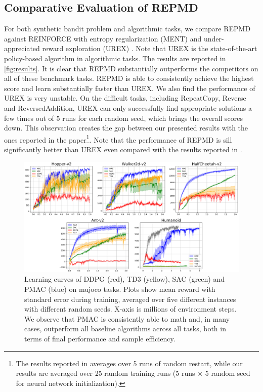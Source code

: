 \subsection{Comparative Evaluation of REPMD}

For both synthetic bandit problem and algorithmic tasks, we compare REPMD against REINFORCE with entropy regularization (MENT) \citep{williams1992simple} and under-appreciated reward exploration (UREX) \citep{nachum2017improving}. Note that UREX is the state-of-the-art policy-based algorithm in algorithmic tasks. The results are reported in \cref{fig:results}. It is clear that REPMD substantially outperforms the competitors on all of these benchmark tasks. REPMD is able to consistently achieve the highest score and learn substantially faster than UREX. We also find the performance of UREX is very unstable. On the difficult tasks, including RepeatCopy, Reverse and ReversedAddition, UREX can only successfully find appropriate solutions a few times out of 5 runs for each random seed, which brings the overall scores down. This observation creates the gap between our presented results with the ones reported in the paper\footnote{The results reported in \citet{nachum2017improving} averages over 5 runs of random restart, while our results are averaged over 25 random training runs (5 runs $\times$ 5 random seed for neural network initialization). }. Note that the performance of REPMD is sill significantly better than UREX even compared with the results reported in \citet{nachum2017improving}. 

\begin{figure}[t]
\begin{center}
\includegraphics[width=0.85\linewidth]{./mujoco-results.pdf}
\end{center}
\caption{
Learning curves of DDPG (red), TD3 (yellow), SAC (green) and PMAC (blue) on mujoco tasks. Plots show mean reward with standard error during training, averaged over five different instances with different random seeds. X-axis is millions of environment steps. We observe that PMAC is consistently able to math and, in many cases, outperform all baseline algorithms across all tasks, both in terms of final performance and sample efficiency. }
\label{fig:result_mujoco } 
\end{figure}

